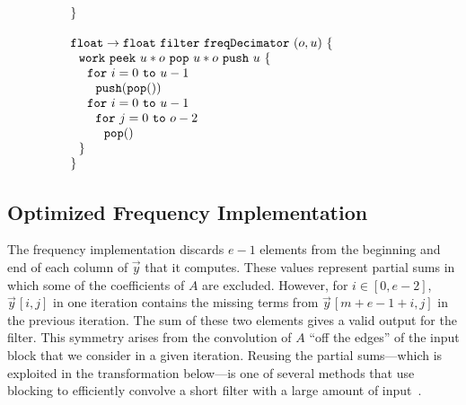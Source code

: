 \documentclass{sig-alternate}
\begin{document}
{\begin{transformation}
\begin{equation}
{\begin{array}{ll}
    {\tt \}} \\ ~ \\
    {\tt float \rightarrow float}~{\tt filter~freqDecimator~}(o, u){\tt ~\{} & \hspace{40pt}\\
    ~~{\tt work~}{\tt peek}~u*o~{\tt pop}~u*o~{\tt push}~u~{\tt \{} \\
    ~~~~{\tt for}~i=0~{\tt to}~u-1 \\
    ~~~~~~{\tt push(pop())} \\
    ~~~~{\tt for}~i=0~{\tt to}~u-1 \\
    ~~~~~~{\tt for}~j=0~{\tt to}~o-2 \\
    ~~~~~~~~{\tt pop()} \\
    ~~{\tt \}} \\
    {\tt \}}
  \end{array}}
\end{equation}
\vspace{-6pt}
\end{transformation}

\subsection{Optimized Frequency Implementation}

The {\naive} frequency implementation discards $e-1$ elements from the
beginning and end of each column of ${\vec y}$ that it computes.
These values represent partial sums in which some of the coefficients
of $A$ are excluded. However, for $i \in [0, e-2]$, ${\vec
y}\hspace{1pt}[i,j]$ in one iteration contains the missing terms from
${\vec y}\hspace{1pt}[m+e-1+i,j]$ in the previous iteration.  The sum
of these two elements gives a valid output for the filter.  This
symmetry arises from the convolution of $A$ ``off the edges'' of the
input block that we consider in a given iteration. Reusing the partial
sums---which is exploited in the transformation below---is one of
several methods that use blocking to efficiently convolve a short
filter with a large amount of input~\cite{oppenheim-discrete}.

}
\end{document}
